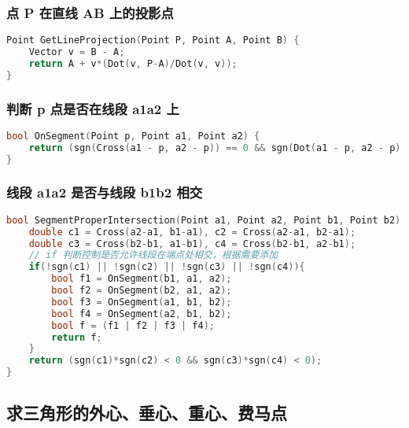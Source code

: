 \subsubsection{点 P 在直线 AB 上的投影点}

\begin{lstlisting}[language=C++]
Point GetLineProjection(Point P, Point A, Point B) {
    Vector v = B - A;
    return A + v*(Dot(v, P-A)/Dot(v, v));
}
\end{lstlisting}

\subsubsection{判断 p 点是否在线段 a1a2 上}

\begin{lstlisting}[language=C++]
bool OnSegment(Point p, Point a1, Point a2) {
    return (sgn(Cross(a1 - p, a2 - p)) == 0 && sgn(Dot(a1 - p, a2 - p)) <= 0);
}
\end{lstlisting}

\subsubsection{线段 a1a2 是否与线段 b1b2 相交}

\begin{lstlisting}[language=C++]
bool SegmentProperIntersection(Point a1, Point a2, Point b1, Point b2) {
    double c1 = Cross(a2-a1, b1-a1), c2 = Cross(a2-a1, b2-a1);
    double c3 = Cross(b2-b1, a1-b1), c4 = Cross(b2-b1, a2-b1);
    // if 判断控制是否允许线段在端点处相交，根据需要添加
    if(!sgn(c1) || !sgn(c2) || !sgn(c3) || !sgn(c4)){
        bool f1 = OnSegment(b1, a1, a2);
        bool f2 = OnSegment(b2, a1, a2);
        bool f3 = OnSegment(a1, b1, b2);
        bool f4 = OnSegment(a2, b1, b2);
        bool f = (f1 | f2 | f3 | f4);
        return f;
    }
    return (sgn(c1)*sgn(c2) < 0 && sgn(c3)*sgn(c4) < 0);
}
\end{lstlisting}

\subsection{求三角形的外心、垂心、重心、费马点}

